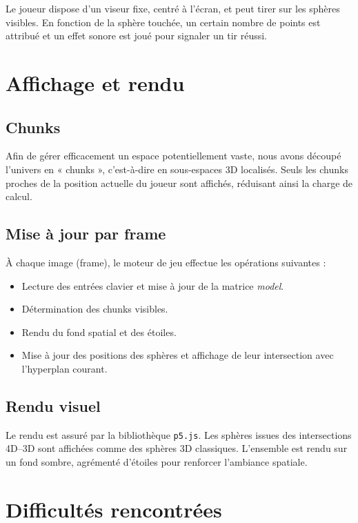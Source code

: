 \documentclass[11pt,a4paper]{article}
\begin{document}
Le joueur dispose d’un viseur fixe, centré à l’écran, et peut tirer sur les sphères visibles. En fonction de la sphère touchée, un certain nombre de points est attribué et un effet sonore est joué pour signaler un tir réussi.

\section{Affichage et rendu}

\subsection{Chunks}

Afin de gérer efficacement un espace potentiellement vaste, nous avons découpé l’univers en « chunks », c’est-à-dire en sous-espaces 3D localisés. Seuls les chunks proches de la position actuelle du joueur sont affichés, réduisant ainsi la charge de calcul.

\subsection{Mise à jour par frame}

À chaque image (frame), le moteur de jeu effectue les opérations suivantes :
\begin{itemize}
	\item Lecture des entrées clavier et mise à jour de la matrice \textit{model}.
	\item Détermination des chunks visibles.
	\item Rendu du fond spatial et des étoiles.
	\item Mise à jour des positions des sphères et affichage de leur intersection avec l’hyperplan courant.
\end{itemize}

\subsection{Rendu visuel}

Le rendu est assuré par la bibliothèque \texttt{p5.js}. Les sphères issues des intersections 4D–3D sont affichées comme des sphères 3D classiques. L’ensemble est rendu sur un fond sombre, agrémenté d’étoiles pour renforcer l’ambiance spatiale.

\section{Difficultés rencontrées}
\end{document}
